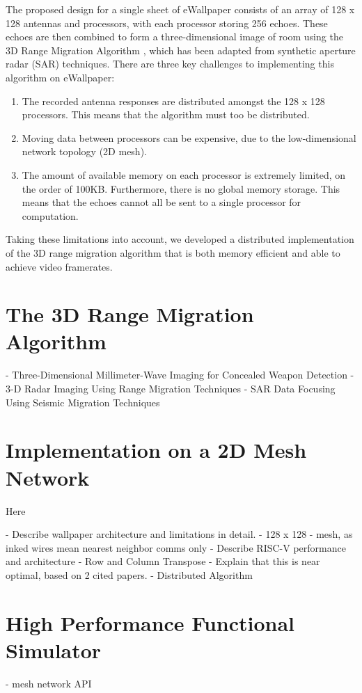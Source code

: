 The proposed design for a single sheet of eWallpaper consists of an array of 128 x 128 antennas and processors, with each processor storing 256 echoes. These echoes are then  combined to form a three-dimensional image of room using the 3D Range Migration Algorithm \cite{3d-imaging-concealed-weapon}, which has been adapted from synthetic aperture radar (SAR) techniques. There are three key challenges to implementing this algorithm on eWallpaper:
\begin{enumerate}
\item The recorded antenna responses are distributed amongst the 128 x 128 processors. This means that the algorithm must too be distributed.
\item Moving data between processors can be expensive, due to the low-dimensional network topology (2D mesh).
\item The amount of available memory on each processor is extremely limited, on the order of 100KB. Furthermore, there is no global memory storage. This means that the echoes cannot all be sent to a single processor for computation.
\end{enumerate}

Taking these limitations into account, we developed a distributed implementation of the 3D range migration algorithm that is both memory efficient and able to achieve video framerates.

\section{The 3D Range Migration Algorithm}
- Three-Dimensional Millimeter-Wave Imaging for Concealed Weapon Detection
- 3-D Radar Imaging Using Range Migration Techniques
- SAR Data Focusing Using Seismic Migration Techniques

\section{Implementation on a 2D Mesh Network}

Here

- Describe wallpaper architecture and limitations in detail.
  - 128 x 128
  - mesh, as inked wires mean nearest neighbor comms only
  - Describe RISC-V performance and architecture
- Row and Column Transpose
- Explain that this is near optimal, based on 2 cited papers.
- Distributed Algorithm

\section{High Performance Functional Simulator}
- mesh network API


